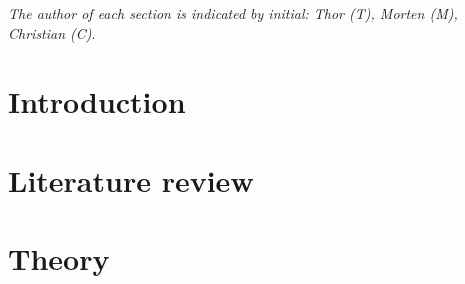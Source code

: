 























%








\maketitle

\thispagestyle{empty}

\clearpage

\pagestyle{scrheadings}\noindent
\textit{The author of each section is indicated by initial: Thor (T), Morten (M), Christian (C)}.
\small {
\tableofcontents
\clearpage
}
\clearpage
\normalsize

\section{Introduction}


\section{Literature review}


\section{Theory}


